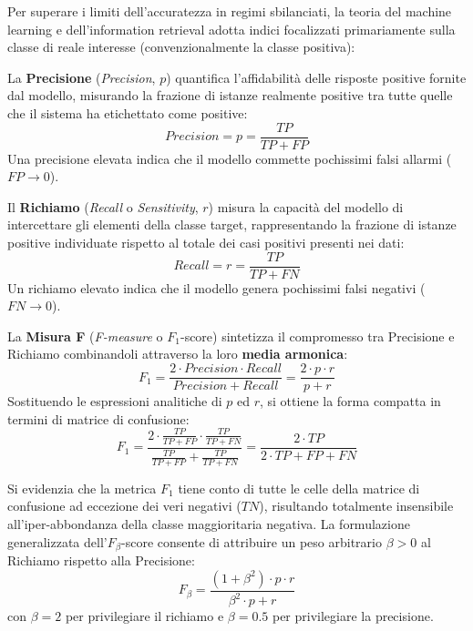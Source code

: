 Per superare i limiti dell'accuratezza in regimi sbilanciati, la teoria del machine learning e dell'information retrieval adotta indici focalizzati primariamente sulla classe di reale interesse (convenzionalmente la classe positiva):

\begin{definition}[Precisione]
La \textbf{Precisione} (\textit{Precision}, $p$) quantifica l'affidabilità delle risposte positive fornite dal modello, misurando la frazione di istanze realmente positive tra tutte quelle che il sistema ha etichettato come positive:
\begin{equation}
    Precision = p = \frac{TP}{TP + FP}
\end{equation}
Una precisione elevata indica che il modello commette pochissimi falsi allarmi ($FP \to 0$).
\end{definition}

\begin{definition}
Il \textbf{Richiamo} (\textit{Recall} o \textit{Sensitivity}, $r$) misura la capacità del modello di intercettare gli elementi della classe target, rappresentando la frazione di istanze positive individuate rispetto al totale dei casi positivi presenti nei dati:
\begin{equation}
    Recall = r = \frac{TP}{TP + FN}
\end{equation}
Un richiamo elevato indica che il modello genera pochissimi falsi negativi ($FN \to 0$).
\end{definition}

\begin{definition}
La \textbf{Misura F} (\textit{F-measure} o $F_1$-score) sintetizza il compromesso tra Precisione e Richiamo combinandoli attraverso la loro \textbf{media armonica}:
\begin{equation}
    F_1 = \frac{2 \cdot Precision \cdot Recall}{Precision + Recall} = \frac{2 \cdot p \cdot r}{p + r}
\end{equation}
Sostituendo le espressioni analitiche di $p$ ed $r$, si ottiene la forma compatta in termini di matrice di confusione:
\begin{equation}
    F_1 = \frac{2 \cdot \frac{TP}{TP + FP} \cdot \frac{TP}{TP + FN}}{\frac{TP}{TP + FP} + \frac{TP}{TP + FN}} = \frac{2 \cdot TP}{2 \cdot TP + FP + FN}
\end{equation}
\end{definition}

Si evidenzia che la metrica $F_1$ tiene conto di tutte le celle della matrice di confusione ad eccezione dei veri negativi ($TN$), risultando totalmente insensibile all'iper-abbondanza della classe maggioritaria negativa.
La formulazione generalizzata dell'$F_\beta$-score consente di attribuire un peso arbitrario $\beta > 0$ al Richiamo rispetto alla Precisione:
\begin{equation}
    F_\beta = \frac{(1 + \beta^2) \cdot p \cdot r}{\beta^2 \cdot p + r}
\end{equation}
con $\beta = 2$ per privilegiare il richiamo e $\beta = 0.5$ per privilegiare la precisione.

